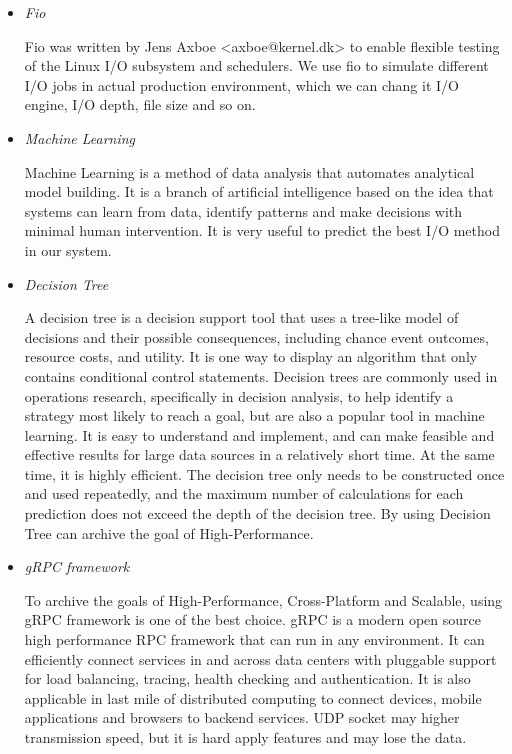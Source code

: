 \documentclass[conference]{IEEEtran}
\begin{document}
\begin{itemize}

	\item \emph{Fio}

	      Fio was written by Jens Axboe <axboe@kernel.dk> to enable flexible testing of
	      the Linux I/O subsystem and schedulers. We use fio to simulate different I/O jobs in actual production environment, which we can chang it I/O engine, I/O depth, file size and so on.

	\item \emph{Machine Learning}

	      Machine Learning is a method of data analysis that automates analytical model building.
	      It is a branch of artificial intelligence based on the idea that systems can learn from data, identify patterns and make decisions with minimal human intervention.
	      It is very useful to predict the best I/O method in our system.

	\item \emph{Decision Tree}

	      A decision tree is a decision support tool that uses a tree-like model of decisions and their possible consequences, including chance event outcomes, resource costs, and utility. It is one way to display an algorithm that only contains conditional control statements.
	      Decision trees are commonly used in operations research, specifically in decision analysis, to help identify a strategy most likely to reach a goal, but are also a popular tool in machine learning.
	      It is easy to understand and implement, and can make feasible and effective results for large data sources in a relatively short time. At the same time, it is highly efficient. The decision tree only needs to be constructed once and used repeatedly,
	      and the maximum number of calculations for each prediction does not exceed the depth of the decision tree. By using Decision Tree can archive the goal of High-Performance.

	\item \emph{gRPC framework}

	      To archive the goals of High-Performance, Cross-Platform and Scalable, using gRPC framework is one of the best choice.
	      gRPC is a modern open source high performance RPC framework that can run in any environment. It can efficiently connect services in
	      and across data centers with pluggable support for load balancing, tracing, health checking and authentication.
	      It is also applicable in last mile of distributed computing to connect devices, mobile applications and browsers to backend services.
	      UDP socket may higher transmission speed, but it is hard apply features and may lose the data.


\end{itemize}
\end{document}
